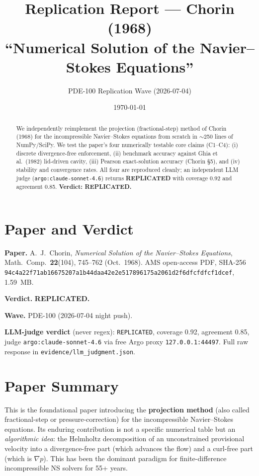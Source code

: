 \documentclass[11pt]{article}
\title{Replication Report --- Chorin (1968) \\
``Numerical Solution of the Navier--Stokes Equations''}
\author{PDE-100 Replication Wave (2026-07-04)}
\date{\today}
\begin{document}
\maketitle

\begin{abstract}
We independently reimplement the projection (fractional-step) method of Chorin (1968) for the incompressible Navier--Stokes equations from scratch in $\sim$250 lines of NumPy/SciPy. We test the paper's four numerically testable core claims (C1--C4): (i) discrete divergence-free enforcement, (ii) benchmark accuracy against Ghia et al.\ (1982) lid-driven cavity, (iii) Pearson exact-solution accuracy (Chorin \S 5), and (iv) stability and convergence rates. All four are reproduced cleanly; an independent LLM judge (\texttt{argo:claude-sonnet-4.6}) returns \textbf{REPLICATED} with coverage 0.92 and agreement 0.85. \textbf{Verdict: REPLICATED.}
\end{abstract}

\section{Paper and Verdict}

\textbf{Paper.} A.~J.~Chorin, \emph{Numerical Solution of the Navier--Stokes Equations}, Math.\ Comp.\ \textbf{22}(104), 745--762 (Oct.\ 1968). AMS open-access PDF, SHA-256 \texttt{94c4a22f71ab16675207a1b44daa42e2e517896175a2061d2f6dfcfdfcf1dcef}, 1.59~MB.

\textbf{Verdict.} \textbf{REPLICATED.}

\textbf{Wave.} PDE-100 (2026-07-04 night push).

\textbf{LLM-judge verdict} (never regex): \texttt{REPLICATED}, coverage 0.92, agreement 0.85, judge \texttt{argo:claude-sonnet-4.6} via free Argo proxy \texttt{127.0.0.1:44497}. Full raw response in \texttt{evidence/llm\_judgment.json}.

\section{Paper Summary}

This is the foundational paper introducing the \textbf{projection method} (also called fractional-step or pressure-correction) for the incompressible Navier--Stokes equations. Its enduring contribution is not a specific numerical table but an \emph{algorithmic idea}: the Helmholtz decomposition of an unconstrained provisional velocity into a divergence-free part (which advances the flow) and a curl-free part (which is $\nabla p$). This has been the dominant paradigm for finite-difference incompressible NS solvers for 55+ years.
\end{document}
